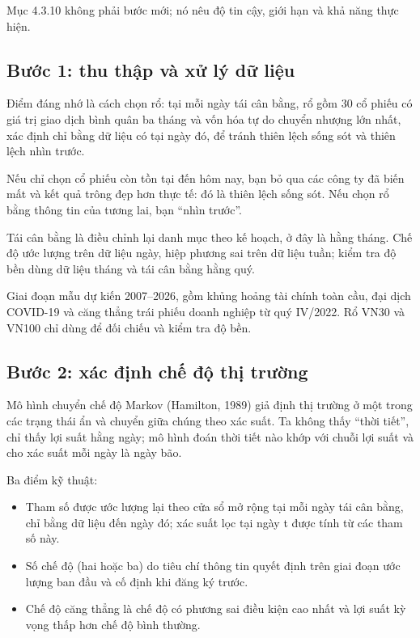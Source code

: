 Mục 4.3.10 không phải bước mới; nó nêu độ tin cậy, giới hạn và khả năng thực hiện.

\subsection{Bước 1: thu thập và xử lý dữ liệu}

Điểm đáng nhớ là cách chọn rổ: tại mỗi ngày tái cân bằng, rổ gồm 30 cổ phiếu có giá trị giao dịch bình quân ba tháng và vốn hóa tự do chuyển nhượng lớn nhất, xác định chỉ bằng dữ liệu có tại ngày đó, để tránh thiên lệch sống sót và thiên lệch nhìn trước.

Nếu chỉ chọn cổ phiếu còn tồn tại đến hôm nay, bạn bỏ qua các công ty đã biến mất và kết quả trông đẹp hơn thực tế: đó là thiên lệch sống sót. Nếu chọn rổ bằng thông tin của tương lai, bạn “nhìn trước”.

Tái cân bằng là điều chỉnh lại danh mục theo kế hoạch, ở đây là hằng tháng. Chế độ ước lượng trên dữ liệu ngày, hiệp phương sai trên dữ liệu tuần; kiểm tra độ bền dùng dữ liệu tháng và tái cân bằng hằng quý.

Giai đoạn mẫu dự kiến 2007--2026, gồm khủng hoảng tài chính toàn cầu, đại dịch COVID-19 và căng thẳng trái phiếu doanh nghiệp từ quý IV/2022. Rổ VN30 và VN100 chỉ dùng để đối chiếu và kiểm tra độ bền.

\subsection{Bước 2: xác định chế độ thị trường}

Mô hình chuyển chế độ Markov (Hamilton, 1989) giả định thị trường ở một trong các trạng thái ẩn và chuyển giữa chúng theo xác suất. Ta không thấy “thời tiết”, chỉ thấy lợi suất hằng ngày; mô hình đoán thời tiết nào khớp với chuỗi lợi suất và cho xác suất mỗi ngày là ngày bão.

Ba điểm kỹ thuật:

\begin{itemize}
\item
  Tham số được ước lượng lại theo cửa sổ mở rộng tại mỗi ngày tái cân bằng, chỉ bằng dữ liệu đến ngày đó; xác suất lọc tại ngày t được tính từ các tham số này.
\item
  Số chế độ (hai hoặc ba) do tiêu chí thông tin quyết định trên giai đoạn ước lượng ban đầu và cố định khi đăng ký trước.
\item
  Chế độ căng thẳng là chế độ có phương sai điều kiện cao nhất và lợi suất kỳ vọng thấp hơn chế độ bình thường.
\end{itemize}

